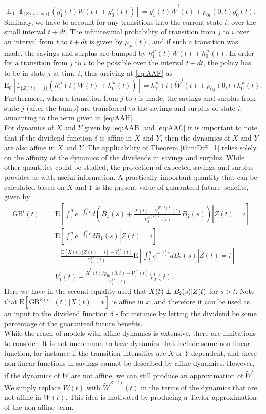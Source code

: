 \documentclass[12pt]{article}
\newcommand{\E}{\text{E}}
\newcommand{\indic}[1]{\mathds{1}_{ \{ #1 \} }}
\newcommand\independent{\protect\mathpalette{\protect\independenT}{\perp}}
\def\independenT#1#2{\mathrel{\rlap{$#1#2$}\mkern2mu{#1#2}}}
\theoremstyle{my_thm}
\begin{document}
$$
\E_0 [\indic{Z(t)=i} \left(g^i_1(t)W(t)+g_0^i(t)\right)]= g_1^i(t)\tilde{W}^i(t)+p_{0i}(0,t)g_0^i(t).
$$
Similarly, we have to account for any transitions into the current state $i$, over the small interval $t+dt$. The infinitesimal probability of transition from $j$ to $i$ over an interval from $t$ to $t+dt$ is given by $\mu_{ji}(t)$, and if such a transition was made, the savings and surplus are bumped by $h^{ji}_1(t)W(t)+h^{ji}_0(t)$. In order for a transition from $j$ to $i$ to be possible over the interval $t+dt$, the policy has to be in state $j$ at time $t$, thus arriving at 
\eqref{eq:AAF} as
$$
\E_0[ \indic{Z(t)=j} \left( h_1^{ji}(t)W(t)+ h_0^{ji}(t)\right)]= h_1^{ji}(t)\tilde{W}^j(t)+ p_{0j}(0,t)h_0^{ji}(t).
$$
Furthermore, when a transition from $j$ to $i$ is made, the savings and surplus from state $j$ (after the bump) are transferred to the savings and surplus of state $i$, amounting to the term given in \eqref{eq:AAH}. 
\\[12pt]
For dynamics of $X$ and $Y$ given by \eqref{eq:AAB} and \eqref{eq:AAC} it is important to note that if the dividend function $\delta$ is affine in $X$ and $Y$, then the dynamics of $X$ and $Y$ are also affine in $X$ and $Y$. The applicability of Theorem \ref{thm:Diff_1} relies solely on the affinity of the dynamics of the dividends in savings and surplus. While other quantities could be studied, the projection of expected savings and surplus provides us with useful information. A practically important quantity that can be calculated based on $\tilde{X}$ and $\tilde{Y}$ is the present value of guaranteed future benefits, given by
\begin{align*}
\text{GB}^i(t)=&\E \left. \left[ \int_t^n e^{-\int_t^s r} d \left( B_1(s)+\frac{X(t)-V_1^{Z(t)*}(t)}{V_2^{Z(t)*}(t)}B_2(s) \right) \right| Z(t)=i\right]
\\
=&
\E \left[ \left. \int_t^n e^{-\int_t^s r} d B_1(s) \right| Z(t)=i \right]
\\
&+ \frac{\E[X(t)|Z(t)=i]-V_1^{i*}(t)}{V_2^{i*}(t)}  \E \left. \left[ \int_t^n e^{-\int_t^s r} dB_2(s) \right| Z(t)=i\right]
\\
=&
V_1^i(t)+\frac{\tilde{X}^{i}(t)/p_{0i}(0,t)-V_1^{i*}(t)}{V_2^{i*}(t)}V_2^i(t).
\end{align*}
Here we have in the second equality used that $X(t)\independent B_2(s)|Z(t)$ for $s>t$. Note that $\E[\text{GB}^{Z(t)}(t)|X(t)=x]$ is affine in $x$, and therefore it can be used as an input to the dividend function $\delta$ - for instance by letting the dividend be some percentage of the guaranteed future benefits.
\\[12pt]
While the reach of models with affine dynamics is extensive, there are limitations to consider. It is not uncommon to have dynamics that include some non-linear function, for instance if the transition intensities are $X$ or $Y$ dependent, and these non-linear functions in savings cannot be described by affine dynamics. However, if the dynamics of $W$ are not affine, we can still produce an approximation of $\tilde{W}^i$. We simply replace $W(t)$ with $\tilde{W}^{Z(t)}(t)$ in the terms of the dynamics that are not affine in $W(t)$. This idea is motivated by producing a Taylor approximation of the non-affine term.
\end{document}
